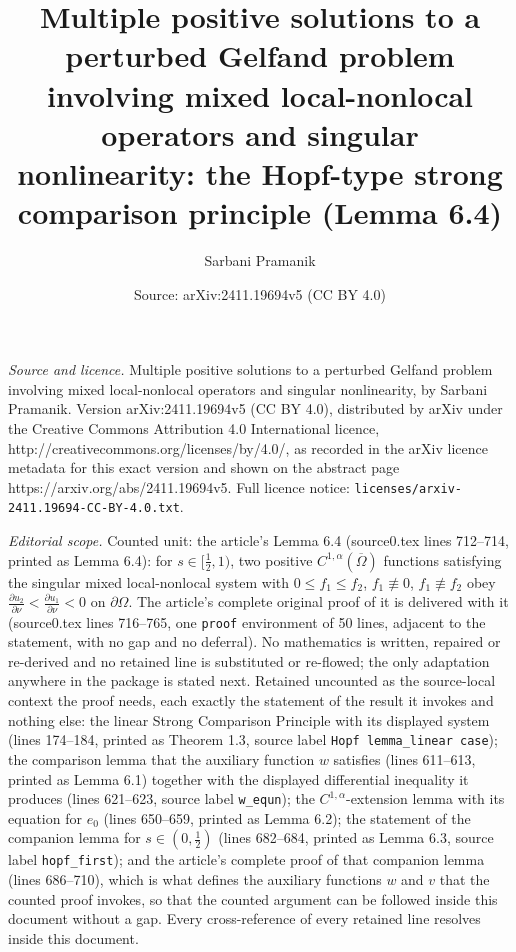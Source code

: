 \documentclass[10pt,a4paper]{amsart}
\title[Lemma 6.4]{Multiple positive solutions to a perturbed Gelfand problem involving mixed local-nonlocal operators and singular nonlinearity: the Hopf-type strong comparison principle (Lemma 6.4)}
\author{Sarbani Pramanik}
\date{Source: arXiv:2411.19694v5 (CC BY 4.0)}
\newcommand{\Om}{\Omega}
\newcommand{\pa}{\partial}
\begin{document}
\maketitle

\noindent\emph{Source and licence.} Multiple positive solutions to a perturbed Gelfand problem involving mixed local-nonlocal operators and singular nonlinearity, by Sarbani Pramanik. Version arXiv:2411.19694v5
(CC BY 4.0), distributed by arXiv under the Creative Commons Attribution 4.0 International licence,
http://creativecommons.org/licenses/by/4.0/, as recorded in the arXiv licence metadata for this exact
version and shown on the abstract page https://arxiv.org/abs/2411.19694v5. Full licence notice:
\texttt{licenses/arxiv-2411.19694-CC-BY-4.0.txt}.\par\smallskip

\noindent\textit{Editorial scope.} Counted unit: the article's Lemma 6.4 (source0.tex lines 712--714, printed as Lemma 6.4): for $s\in[\frac12,1)$, two positive $C^{1,\alpha}(\overline{\Om})$ functions satisfying the singular mixed local-nonlocal system with $0\le f_1\le f_2$, $f_1\not\equiv 0$, $f_1\not\equiv f_2$ obey $\frac{\pa u_2}{\pa\nu}<\frac{\pa u_1}{\pa\nu}<0$ on $\pa\Om$. The article's complete original proof of it is delivered with it (source0.tex lines 716--765, one \texttt{proof} environment of 50 lines, adjacent to the statement, with no gap and no deferral). No mathematics is written, repaired or re-derived and no retained line is substituted or re-flowed; the only adaptation anywhere in the package is stated next. Retained uncounted as the source-local context the proof needs, each exactly the statement of the result it invokes and nothing else: the linear Strong Comparison Principle with its displayed system (lines 174--184, printed as Theorem 1.3, source label \texttt{Hopf lemma\_linear case}); the comparison lemma that the auxiliary function $w$ satisfies (lines 611--613, printed as Lemma 6.1) together with the displayed differential inequality it produces (lines 621--623, source label \texttt{w\_equn}); the $C^{1,\alpha}$-extension lemma with its equation for $e_0$ (lines 650--659, printed as Lemma 6.2); the statement of the companion lemma for $s\in(0,\frac12)$ (lines 682--684, printed as Lemma 6.3, source label \texttt{hopf\_first}); and the article's complete proof of that companion lemma (lines 686--710), which is what defines the auxiliary functions $w$ and $v$ that the counted proof invokes, so that the counted argument can be followed inside this document without a gap. Every cross-reference of every retained line resolves inside this document.
\end{document}
